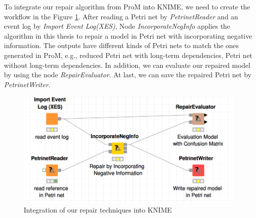 To integrate our repair algorithm from ProM into KNIME, we need to create the workflow in the Figure \ref{fig:impl-KNIME}. After reading a Petri net by  \emph{PetrinetReader} and an event log by \emph{Import Event Log(XES)}, Node \emph{IncorporateNegInfo} applies the algorithm in this thesis to repair a model in Petri net with incorporating negative information. The outputs have different kinds of Petri nets to match the ones generated in ProM, e.g., reduced Petri net with long-term dependencies, Petri net without long-term dependencies. In addition, we can evaluate our repaired model by using the node \emph{RepairEvaluator}. At last, we can save the repaired Petri net by \emph{PetrinetWriter}.
\begin{figure}
	\centering
	\includegraphics[width=\textwidth]{figures/implementation/implementation-KNIME.png}
	\caption{Integration of our repair techniques into KNIME}
	\label{fig:impl-KNIME}
\end{figure}
